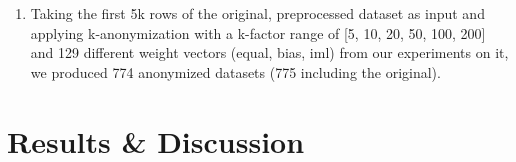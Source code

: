 \documentclass{llncs}
\begin{document}
\begin{enumerate}
	\item Taking the first 5k rows of the original, preprocessed dataset as input and applying k-anonymization with a k-factor range of [5, 10, 20, 50, 100, 200] and 129 different weight vectors (equal, bias, iml) from our experiments on it, we produced 774 anonymized datasets (775 including the original).
\end{enumerate}


\section{Results \& Discussion}
\label{sect:results}
\end{document}
